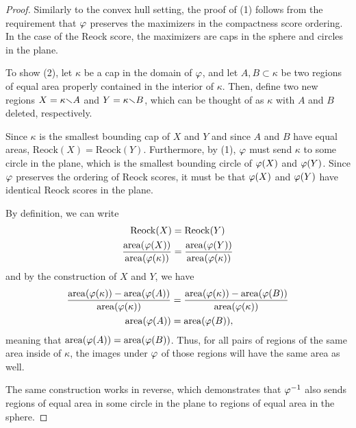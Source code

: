 \begin{proof}
  Similarly to the convex hull setting, the proof of (1) follows from
  the requirement that $\varphi$ preserves the maximizers in the
  compactness score ordering.  In the case of the Reock score, the
  maximizers are caps in the sphere and circles in the plane.  

  To show (2), let $\kappa$ be a cap in the domain of $\varphi$, and let 
  $A,B\subset \kappa$ be two regions of equal area properly 
  contained in the interior of $\kappa$. Then, define two new regions
  $X=\kappa{\smallsetminus} A$ and $Y=\kappa{\smallsetminus} B$, which can be thought of as
  $\kappa$ with $A$ and $B$ deleted, respectively. 

  Since $\kappa$ is the smallest bounding cap of $X$ and $Y$ and since
  $A$ and $B$ have equal areas, $\mathrm{Reock}(X)=\mathrm{Reock}(Y)$.
  Furthermore, by (1), $\varphi$ must send $\kappa$ to some circle in
  the plane, which is the smallest bounding circle of $\varphi(X)$ and
  $\varphi(Y)$.    
  Since $\varphi$ preserves the ordering of Reock scores, it must be
  that $\varphi(X)$ and $\varphi(Y)$ have identical Reock scores in the
  plane.

  By definition, we can write
  \begin{align*}
    \mathrm{Reock}(X) &= \mathrm{Reock}(Y)\\
    \frac{\mathrm{area}(\varphi(X))}{\mathrm{area}(\varphi(\kappa))} &= \frac{\mathrm{area}(\varphi(Y))}{\mathrm{area}(\varphi(\kappa))}
  \end{align*}
  and by the construction of $X$ and $Y$, we have 
  \begin{align*}
    \frac{\mathrm{area}(\varphi(\kappa))
    - \mathrm{area}(\varphi(A))}{\mathrm{area}(\varphi(\kappa))} &=
    \frac{\mathrm{area}(\varphi(\kappa))
    - \mathrm{area}(\varphi(B))}{\mathrm{area}(\varphi(\kappa))}\\
    \mathrm{area}(\varphi(A)) &= \mathrm{area}(\varphi(B)),
  \end{align*}
  meaning that $\mathrm{area}(\varphi(A)) = \mathrm{area}(\varphi(B))$. 
  Thus, for all pairs of regions of the same area inside of $\kappa$,
  the images under $\varphi$ of those regions will have the same area as
  well.

  The same construction works in reverse, which demonstrates that
  $\varphi^{-1}$ also sends regions of equal area in some circle in the
  plane to regions of  equal area in the sphere.
\end{proof} 

